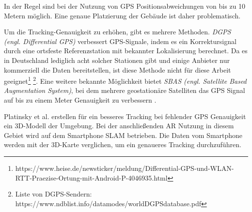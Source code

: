 In der Regel sind bei der Nutzung von GPS Positionsabweichungen von bis zu 10 Metern möglich. Eine genaue Platzierung der Gebäude ist daher problematisch.

Um die Tracking-Genauigkeit zu erhöhen, gibt es mehrere Methoden. \textit{DGPS (engl. Differential GPS)} verbessert GPS-Signale, indem es ein Korrektursignal durch eine ortsfeste Referenzstation mit bekannter Lokalisierung berechnet. Da es in Deutschland lediglich acht solcher Stationen gibt und einige Anbieter nur kommerziell die Daten bereitstellen, ist diese Methode nicht für diese Arbeit geeignet\footnote{https://www.heise.de/newsticker/meldung/Differential-GPS-und-WLAN-RTT-Praezise-Ortung-mit-Android-P-4046935.html} \footnote{Liste von DGPS-Sendern: https://www.ndblist.info/datamodes/worldDGPSdatabase.pdf}. Eine weitere bekannte Möglichkeit bietet \textit{SBAS (engl. Satellite Based Augmentation System)}, bei dem mehrere geostationäre Satelliten das GPS Signal auf bis zu einem Meter Genauigkeit zu verbessern \cite*{doerner}.

Platinsky et al.\cite{platinsky} erstellen für ein besseres Tracking bei fehlender GPS Genauigkeit ein 3D-Modell der Umgebung. Bei der anschließenden AR Nutzung in diesem Gebiet wird auf dem Smartphone SLAM betrieben. Die Daten vom Smartphone werden mit der 3D-Karte verglichen, um ein genaueres Tracking durchzuführen.